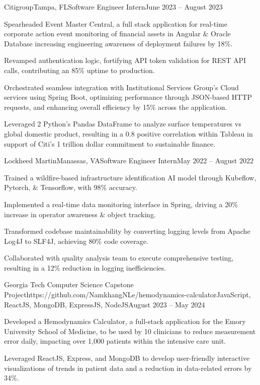 \documentclass{article}
\begin{document}
\begin{flushleft}
    \begin{experience}{Citigroup}{Tampa, FL}{Software Engineer Intern}{June 2023 -- August 2023}
        \item Spearheaded Event Master Central, a full stack application for real-time corporate action event monitoring of financial assets in Angular \& Oracle Database increasing engineering awareness of deployment failures by 18\%.
        \item Revamped authentication logic, fortifying API token validation for REST API calls, contributing an 85\% uptime to production.
        \item Orchestrated seamless integration with Institutional Services Group's Cloud services using Spring Boot, optimizing performance through JSON-based HTTP requests, and enhancing overall efficiency by 15\% across the application.
        \item Leveraged 2 Python’s Pandas DataFrame to analyze surface temperatures vs global domestic product, resulting in a 0.8 positive correlation within Tableau in support of Citi's 1 trillion dollar commitment to sustainable finance.
    \end{experience}

    \begin{experience}{Lockheed Martin}{Manassas, VA}{Software Engineer Intern}{May 2022 -- August 2022}
        \item Trained a wildfire-based infrastructure identification AI model through Kubeflow, Pytorch, \& Tensorflow, with 98\% accuracy.
        \item Implemented a real-time data monitoring interface in Spring, driving a 20\% increase in operator awareness \& object tracking.
        \item Transformed codebase maintainability by converting logging levels from Apache Log4J to SLF4J, achieving 80\% code coverage.
        \item Collaborated with quality analysis team to execute comprehensive testing, resulting in a 12\% reduction in logging inefficiencies.
        
    \end{experience}
    


    \vspace{3pt}

    \begin{project}{Georgia Tech Computer Science Capstone Project}{https://github.com/NamkhangNLe/hemodynamics-calculator}{JavaScript, ReactJS, MongoDB, ExpressJS, NodeJS}{August 2023 -- May 2024}
        \item Developed a Hemodynamics Calculator, a full-stack application for the Emory University School of Medicine, to be used by 10 clinicians to reduce measurement error daily, impacting over 1,000 patients within the intensive care unit.
        \item Leveraged ReactJS, Express, and MongoDB to develop user-friendly interactive visualizations of trends in patient data and a reduction in data-related errors by 34\%.
    \end{project}


\end{flushleft}
\end{document}

